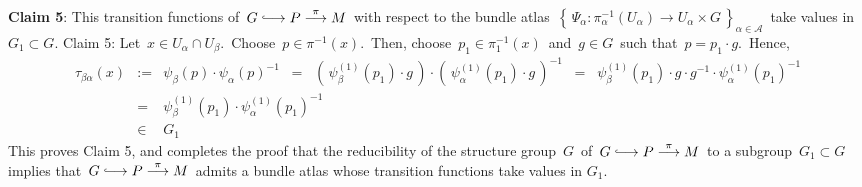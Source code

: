 \vskip 0.5cm
\noindent
\textbf{Claim 5}:\quad
This transition functions of
\,$G \longhookrightarrow P \overset{\pi}{\longrightarrow} M$\,
with respect to the bundle atlas
\,$\left\{\,\Psi_{\alpha} : \pi_{\alpha}^{-1}(U_{\alpha}) \longrightarrow U_{\alpha} \times G\,\right\}_{\alpha\in\mathcal{A}}$\,
take values in \,$G_{1} \subset G$.
\vskip 0.2cm
\proofof Claim 5:\quad
Let \,$x \in U_{\alpha} \cap U_{\beta}$.\,
Choose \,$p \in \pi^{-1}(x)$.\,
Then, choose \,$p_{1} \in \pi_{1}^{-1}(x)$\, and \,$g \in G$\, such that \,$p = p_{1} \cdot g$.\,
Hence,
\begin{eqnarray*}
\tau_{\beta\alpha}(x)
& := &
	\psi_{\beta}(p) \cdot \psi_{\alpha}(p)^{-1}
\;\; = \;\;
	\left(\,\psi_{\beta}^{(1)}(p_{1}) \cdot g\,\right) \cdot \left(\,\psi_{\alpha}^{(1)}(p_{1}) \cdot g\,\right)^{-1}	
\;\; = \;\;
	\psi_{\beta}^{(1)}(p_{1}) \cdot g \cdot g^{-1} \cdot \psi_{\alpha}^{(1)}(p_{1})^{-1}	
\\
& = &
	\psi_{\beta}^{(1)}(p_{1}) \cdot \psi_{\alpha}^{(1)}(p_{1})^{-1}	
\\
& \in &
	G_{1}
\end{eqnarray*}
This proves Claim 5, and completes the proof that
the reducibility of the structure group \,$G$\, of
\,$G \longhookrightarrow P \overset{\pi}{\longrightarrow} M$\,
to a subgroup \,$G_{1} \subset G$\, implies that
\,$G \longhookrightarrow P \overset{\pi}{\longrightarrow} M$\,
admits a bundle atlas whose transition functions take values in $G_{1}$.

